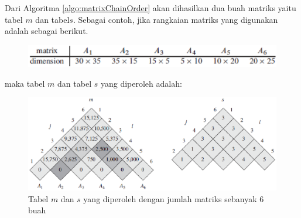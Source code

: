 Dari Algoritma \ref{algo:matrixChainOrder} akan dihasilkan dua buah matriks yaitu tabel $m$ dan tabel$s$. Sebagai contoh, jika rangkaian matriks yang digunakan adalah sebagai berikut.

\begin{figure}[H]%
	\includegraphics[scale=0.5]{fig/matrix.eps}%
	\label{fig:matrix}%
\end{figure}

maka tabel $m$ dan tabel $s$ yang diperoleh adalah:
\begin{figure}[H]%
	\includegraphics[scale=0.7]{fig/matrix2.eps}%
	\caption{Tabel $m$ dan $s$ yang diperoleh dengan jumlah matriks sebanyak 6 buah}
	\label{fig:matrix2}%
\end{figure}
